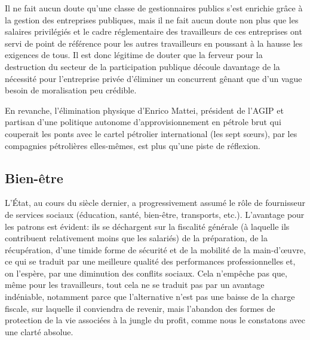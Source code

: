 Il ne fait aucun doute qu'une classe de gestionnaires publics s'est enrichie grâce à la gestion des entreprises publiques, mais il ne fait aucun doute non plus que les salaires privilégiés et le cadre réglementaire des travailleurs de ces entreprises ont servi de point de référence pour les autres travailleurs en poussant à la hausse les exigences de tous. Il est donc légitime de douter que la ferveur pour la destruction du secteur de la participation publique découle davantage de la nécessité pour l'entreprise privée d'éliminer un concurrent gênant que d'un vague besoin de moralisation peu crédible.

En revanche, l'élimination physique d'Enrico Mattei, président de l'AGIP et partisan d'une politique autonome d'approvisionnement en pétrole brut qui couperait les ponts avec le cartel pétrolier international (les sept sœurs), par les compagnies pétrolières elles-mêmes, est plus qu'une piste de réflexion.

\subsection{Bien-être}

L'État, au cours du siècle dernier, a progressivement assumé le rôle de fournisseur de services sociaux (éducation, santé, bien-être, transports, etc.). L'avantage pour les patrons est évident: ils se déchargent sur la fiscalité générale (à laquelle ils contribuent relativement moins que les salariés) de la préparation, de la récupération, d'une timide forme de sécurité et de la mobilité de la main-d'œuvre, ce qui se traduit par une meilleure qualité des performances professionnelles et, on l'espère, par une diminution des conflits sociaux. Cela n'empêche pas que, même pour les travailleurs, tout cela ne se traduit pas par un avantage indéniable, notamment parce que l'alternative n'est pas une baisse de la charge fiscale, sur laquelle il conviendra de revenir, mais l'abandon des formes de protection de la vie associées à la jungle du profit, comme nous le constatons avec une clarté absolue.


